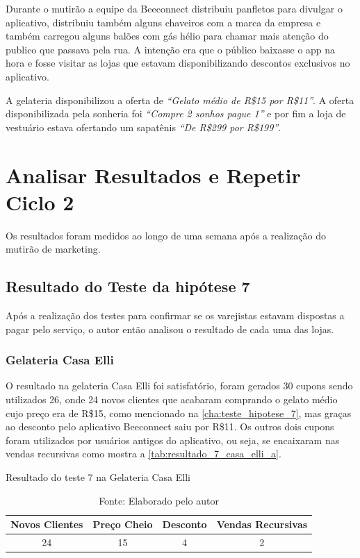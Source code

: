 Durante o mutirão a equipe da Beeconnect distribuiu panfletos para divulgar o aplicativo, distribuiu também alguns chaveiros com a marca da empresa e também carregou alguns balões com gás hélio para chamar mais atenção do publico que passava pela rua. A intenção era que o público baixasse o app na hora e fosse visitar as lojas que estavam disponibilizando descontos exclusivos no aplicativo.

A gelateria disponibilizou a oferta de \textit{\enquote{Gelato médio de R\$15 por R\$11}}. A oferta disponibilizada pela sonheria foi \textit{\enquote{Compre 2 sonhos pague 1}} e por fim a loja de vestuário estava ofertando um sapatênis \textit{\enquote{De R\$299 por R\$199}}.

\section{Analisar Resultados e Repetir Ciclo 2}
\label{cha:analisar_resultados_2}
Os resultados foram medidos ao longo de uma semana após a realização do mutirão de marketing.

\subsection{Resultado do Teste da hipótese 7}
\label{cha:resultado_7}
Após a realização dos testes para confirmar se os varejistas estavam dispostas a pagar pelo serviço, o autor então analisou o resultado de cada uma das lojas.

\subsubsection{Gelateria Casa Elli}
\label{cha:resultado_casa_elli}
O resultado na gelateria Casa Elli foi satisfatório, foram gerados 30 cupons sendo utilizados 26, onde 24 novos clientes que acabaram comprando o gelato médio cujo preço era de R\$15, como mencionado na \autoref{cha:teste_hipotese_7}, mas graças ao desconto pelo aplicativo Beeconnect saiu por R\$11. Os outros dois cupons foram utilizados por usuários antigos do aplicativo, ou seja, se encaixaram nas vendas recursivas como mostra a \autoref{tab:resultado_7_casa_elli_a}.

\begin{table}[H]
\centering
\caption{Resultado do teste 7 na Gelateria Casa Elli}
\label{tab:resultado_7_casa_elli_a}
\begin{tabular}{|c|c|c|c|}
\hline
Novos Clientes & Preço Cheio & Desconto & Vendas Recursivas \\ \hline
24             & 15          & 4        & 2   \\ \hline
\end{tabular}
\caption* {Fonte: Elaborado pelo autor}    
\end{table}

